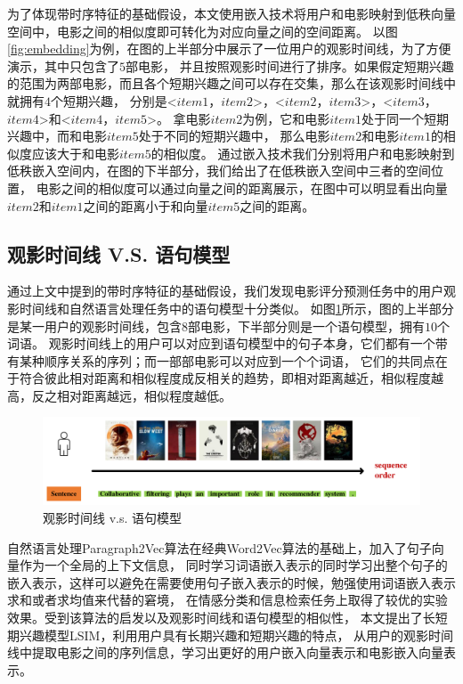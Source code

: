 为了体现带时序特征的基础假设，本文使用嵌入技术将用户和电影映射到低秩向量空间中，电影之间的相似度即可转化为对应向量之间的空间距离。
以图\ref{fig:embedding}为例，在图的上半部分中展示了一位用户的观影时间线，为了方便演示，其中只包含了$5$部电影，
并且按照观影时间进行了排序。如果假定短期兴趣的范围为两部电影，而且各个短期兴趣之间可以存在交集，那么在该观影时间线中就拥有$4$个短期兴趣，
分别是<$item1$，$item2$>，<$item2$，$item3$>，<$item3$，$item4$>和<$item4$，$item5$>。
拿电影$item2$为例，它和电影$item1$处于同一个短期兴趣中，而和电影$item5$处于不同的短期兴趣中，
那么电影$item2$和电影$item1$的相似度应该大于和电影$item5$的相似度。
通过嵌入技术我们分别将用户和电影映射到低秩嵌入空间内，在图的下半部分，我们给出了在低秩嵌入空间中三者的空间位置，
电影之间的相似度可以通过向量之间的距离展示，在图中可以明显看出向量$item2$和$item1$之间的距离小于和向量$item5$之间的距离。

\subsection{观影时间线 V.S. 语句模型}
通过上文中提到的带时序特征的基础假设，我们发现电影评分预测任务中的用户观影时间线和自然语言处理任务中的语句模型十分类似。
如图\ref{fig:example2}所示，图的上半部分是某一用户的观影时间线，包含$8$部电影，下半部分则是一个语句模型，拥有$10$个词语。
观影时间线上的用户可以对应到语句模型中的句子本身，它们都有一个带有某种顺序关系的序列；而一部部电影可以对应到一个个词语，
它们的共同点在于符合彼此相对距离和相似程度成反相关的趋势，即相对距离越近，相似程度越高，反之相对距离越远，相似程度越低。

\begin{figure}[htbp]
\centering
\includegraphics[scale=0.33]{images/example2.pdf}
\caption{观影时间线 v.s. 语句模型}
\label{fig:example2}
\end{figure}

自然语言处理Paragraph2Vec算法\parencite{le2014distributed}在经典Word2Vec算法的基础上，加入了句子向量作为一个全局的上下文信息，
同时学习词语嵌入表示的同时学习出整个句子的嵌入表示，这样可以避免在需要使用句子嵌入表示的时候，勉强使用词语嵌入表示求和或者求均值来代替的窘境，
在情感分类和信息检索任务上取得了较优的实验效果。受到该算法的启发以及观影时间线和语句模型的相似性，
本文提出了长短期兴趣模型LSIM，利用用户具有长期兴趣和短期兴趣的特点，
从用户的观影时间线中提取电影之间的序列信息，学习出更好的用户嵌入向量表示和电影嵌入向量表示。

